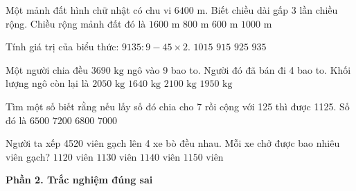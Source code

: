 \begin{ex} %
Một mảnh đất hình chữ nhật có chu vi $6400\text{ m}$. Biết chiều dài gấp 3 lần chiều rộng. Chiều rộng mảnh đất đó là
\choice
{$1600\text{ m}$}
{\True $800\text{ m}$}
{$600\text{ m}$}
{$1000\text{ m}$}
\end{ex}

\begin{ex} %
Tính giá trị của biểu thức: $9135 : 9 - 45 \times 2$.
\choice
{$1015$}
{$915$}
{\True $925$}
{$935$}
\end{ex}

\begin{ex} %
Một người chia đều $3690\text{ kg}$ ngô vào 9 bao to. Người đó đã bán đi 4 bao to. Khối lượng ngô còn lại là
\choice
{\True $2050\text{ kg}$}
{$1640\text{ kg}$}
{$2100\text{ kg}$}
{$1950\text{ kg}$}
\end{ex}

\begin{ex} %
Tìm một số biết rằng nếu lấy số đó chia cho 7 rồi cộng với 125 thì được 1125. Số đó là
\choice
{$6500$}
{$7200$}
{$6800$}
{\True $7000$}
\end{ex}

\begin{ex} %
Người ta xếp 4520 viên gạch lên 4 xe bò đều nhau. Mỗi xe chở được bao nhiêu viên gạch?
\choice
{$1120$ viên}
{\True $1130$ viên}
{$1140$ viên}
{$1150$ viên}
\end{ex}

\textbf{Phần 2. Trắc nghiệm đúng sai}

